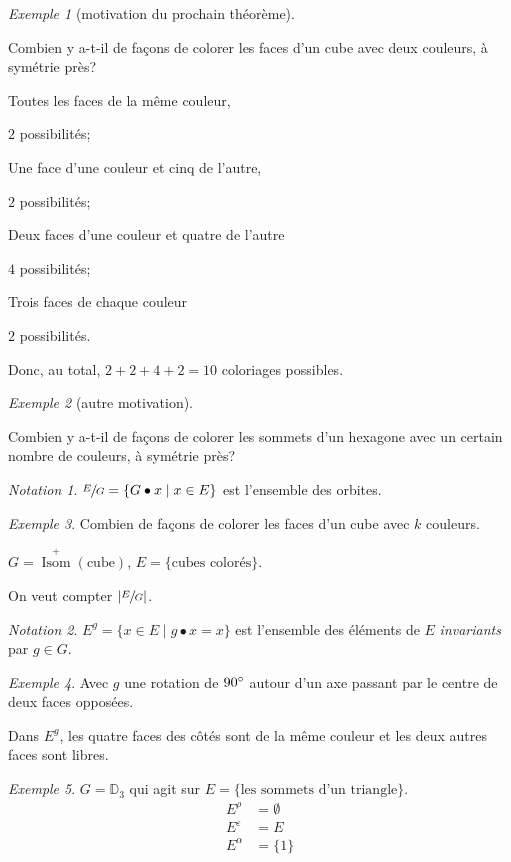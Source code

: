 \documentclass{report}
\newcommand*{\card}[1]{\left| #1 \right|}
\theoremstyle{definition}
\theoremstyle{remark}
\newtheorem*{exem}{Exemple}
\newtheorem*{nota}{Notation}
\begin{document}
	\begin{exem}[motivation du prochain th\'eor\`eme]~

		Combien y a-t-il de fa\c cons de colorer les faces d'un cube avec deux couleurs, \`a sym\'etrie pr\`es?
		\begin{nlist}
			\item Toutes les faces de la m\^eme couleur,

			$2$ possibilit\'es;
			\item Une face d'une couleur et cinq de l'autre,

			$2$ possibilit\'es;
			\item Deux faces d'une couleur et quatre de l'autre

			$4$ possibilit\'es;
			\item Trois faces de chaque couleur

			$2$ possibilit\'es.
		\end{nlist}

		Donc, au total, $2 + 2 + 4 + 2 = 10$ coloriages possibles.
	\end{exem}
	\begin{exem}[autre motivation]~

		Combien y a-t-il de fa\c cons de colorer les sommets d'un hexagone avec un certain nombre de couleurs, \`a sym\'etrie pr\`es?
	\end{exem}

	
	\begin{nota}
		$\sfrac{E}{G} = \{G \bullet x \mid x \in E\}$ est l'ensemble des orbites.
	\end{nota}
	\begin{exem}
		Combien de fa\c cons de colorer les faces d'un cube avec $k$ couleurs.

		$G = \overset{+}{\operatorname{Isom}}(\mathrm{cube})$, $E = \{\text{cubes color\'es}\}$.

		On veut compter $\card{\sfrac{E}{G}}$.
	\end{exem}
	\begin{nota}
		$E^g = \{x \in E \mid g \bullet x = x\}$ est l'ensemble des \'el\'ements de $E$ \emph{invariants} par $g \in G$.
	\end{nota}
	\begin{exem}
		Avec $g$ une rotation de $90\degree$ autour d'un axe passant par le centre de deux faces oppos\'ees.

		Dans $E^g$, les quatre faces des c\^ot\'es sont de la m\^eme couleur et les deux autres faces sont libres.
	\end{exem}
	\begin{exem}
		$G = \mathbb{D}_3$ qui agit sur $E = \{\text{les sommets d'un triangle}\}$.
		\begin{align*}
			E^\rho&= \emptyset\\
			E^\varepsilon&= E\\
			E^\alpha&= \{1\}
		\end{align*}
	\end{exem}
\end{document}
